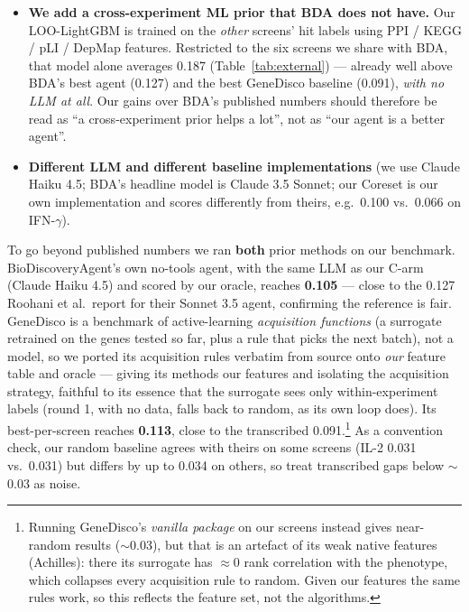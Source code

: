 \documentclass[11pt]{article}
\begin{document}
\begin{itemize}\itemsep2pt
  \item \textbf{We add a cross-experiment ML prior that BDA does not have.} Our LOO-LightGBM is
  trained on the \emph{other} screens' hit labels using PPI / KEGG / pLI / DepMap features. Restricted
  to the six screens we share with BDA, that model alone averages 0.187 (Table~\ref{tab:external}) ---
  already well above BDA's best agent (0.127) and the best GeneDisco baseline (0.091), \emph{with no LLM
  at all}. Our gains over BDA's published numbers should therefore be read as ``a cross-experiment prior
  helps a lot'', not as ``our agent is a better agent''.
  \item \textbf{Different LLM and different baseline implementations} (we use Claude Haiku 4.5;
  BDA's headline model is Claude 3.5 Sonnet; our Coreset is our own implementation and scores
  differently from theirs, e.g.\ 0.100 vs.\ 0.066 on IFN-$\gamma$).
\end{itemize}

\noindent
To go beyond published numbers we ran \textbf{both} prior methods on our benchmark. BioDiscoveryAgent's
own no-tools agent, with the same LLM as our C-arm (Claude Haiku 4.5) and scored by our oracle, reaches
\textbf{0.105} --- close to the 0.127 Roohani et al.\ report for their Sonnet 3.5 agent, confirming the
reference is fair. GeneDisco is a benchmark of active-learning \emph{acquisition functions} (a surrogate
retrained on the genes tested so far, plus a rule that picks the next batch), not a model, so we ported
its acquisition rules verbatim from source onto \emph{our} feature table and oracle --- giving its
methods our features and isolating the acquisition strategy, faithful to its essence that the surrogate
sees only within-experiment labels (round 1, with no data, falls back to random, as its own loop does).
Its best-per-screen reaches \textbf{0.113}, close to the transcribed 0.091.\footnote{Running GeneDisco's
\emph{vanilla package} on our screens instead gives near-random results ($\sim$0.03), but that is an
artefact of its weak native features (Achilles): there its surrogate has $\approx$0 rank correlation
with the phenotype, which collapses every acquisition rule to random. Given our features the same rules
work, so this reflects the feature set, not the algorithms.} As a convention check, our random baseline
agrees with theirs on some screens (IL-2 0.031 vs.\ 0.031) but differs by up to 0.034 on others, so
treat transcribed gaps below $\sim$0.03 as noise.
\end{document}
